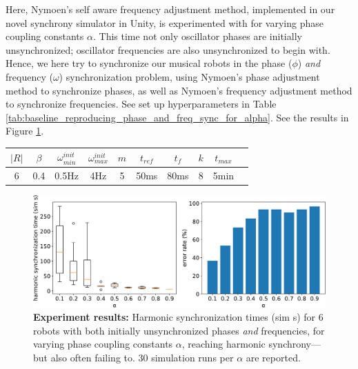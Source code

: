 			Here, Nymoen's self aware frequency adjustment method, implemented in our novel synchrony simulator in Unity, is experimented with for varying phase coupling constants $\alpha$. This time not only oscillator phases are initially unsynchronized; oscillator frequencies are also unsynchronized to begin with. Hence, we here try to synchronize our musical robots in the phase ($\phi$) \textit{and} frequency ($\omega$) synchronization problem, using Nymoen's phase adjustment method to synchronize phases, as well as Nymoen's frequency adjustment method to synchronize frequencies. See set up hyperparameters in Table \ref{tab:baseline_reproducing_phase_and_freq_sync_for_alpha}. See the results in Figure \ref{fig:baseline_reproducing_phase_and_freq_sync_for_alpha}.
			
			\begin{center}
			\begin{tabular}{ |c|c|c|c|c|c|c|c|c|c| } 
			\hline
			$|R|$ & $\beta$ & $\omega_{min}^{init}$ & $\omega_{max}^{init}$ & $m$ & $t_{ref}$ & $t_f$ & $k$ & $t_{max}$ \\
			\hline
			6 & 0.4 & 0.5Hz & 4Hz & 5 & 50ms & 80ms & 8 & 5min \\
			\hline
			\end{tabular}
			\label{tab:baseline_reproducing_phase_and_freq_sync_for_alpha}
			\end{center}
			
			\begin{figure}[ht!]
				\centering
				\includegraphics[width=\linewidth]{Assets/DocSegments/Chapters/ExperimentsAndResults/Figures/PerfScores/baseline_reproducing_phase_and_freq_sync_for_alpha.pdf}
				\caption[Experiment results for first $\phi$ \& $\omega$ synchronization baseline reproduction experiment.]{\textbf{Experiment results:} Harmonic synchronization times (sim s) for 6 robots with both initially unsynchronized phases \textit{and} frequencies, for varying phase coupling constants $\alpha$, reaching harmonic synchrony—but also often failing to. 30 simulation runs per $\alpha$ are reported.}
				\label{fig:baseline_reproducing_phase_and_freq_sync_for_alpha}
			\end{figure}
			
